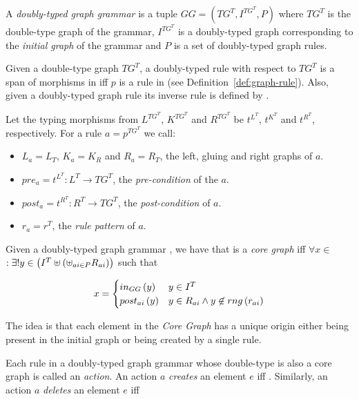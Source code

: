 \begin{definition} A \emph{doubly-typed graph grammar} is a tuple $GG = \left(TG^T, I^{TG^T},P \right)$ where $TG^T$ is the double-type graph of the grammar, $I^{TG^T}$ is a doubly-typed graph corresponding to the \emph{initial graph} of the grammar and $P$ is a set of doubly-typed graph rules. 
\end{definition}

\begin{definition} Given a double-type graph $TG^T$, a doubly-typed rule with respect to $TG^T$ is a span of morphisms \doublyTypedRule{} in \doublyTypedGraphCategory{} iff $p$ is a rule in \typedGraphCategory{} (see Definition~\ref{def:graph-rule}). Also, given a doubly-typed graph rule \doublyTypedRule{} its inverse rule is defined by \inverseDoublyTypedRule{}.

  Let the typing morphisms from $L^{TG^T}$, $K^{TG^T}$ and $R^{TG^T}$ be $t^{L^T}$, $t^{K^T}$ and $t^{R^T}$, respectively. For a rule $a = p^{TG^T}$ we call:

  \begin{itemize}
    \item $L_a = L_T$, $K_a = K_R$ and $R_a = R_T$, the left, gluing and right graphs of $a$.
    \item $pre_a = t^{L^T} : L^T \rightarrow TG^T$, the \emph{pre-condition} of the $a$.
    \item $post_a = t^{R^T} : R^T \rightarrow TG^T$, the \emph{post-condition} of $a$.
    \item $r_a = r^T$, the \emph{rule pattern} of $a$.
  \end{itemize}
\end{definition}

\begin{definition} Given a doubly-typed graph grammar \doublyTypedGraphGrammarCore{}, we have that \coreGraph{} is a \emph{core graph} iff $\forall x \in$ \coreGraph $: \exists! y \in \left(I^T \uplus \left(\uplus_{ai \in P} R_{ai}\right)\right)$ such that

  \[ x =
    \begin{cases}
      in_{GG}\left(y\right) & y \in I^T\\
      post_{ai}\left(y\right) & y \in R_{ai} \land y \not\in rng\left(r_{ai}\right)\\
    \end{cases}
   \]

  \begin{intuition} The idea is that each element in the \emph{Core Graph} has a unique origin either being present in the initial graph or being created by a single rule.
\end{intuition}

  Each rule in a doubly-typed graph grammar whose double-type is also a core graph is called an \emph{action}. An action $a$ \emph{creates} an element $e$ iff . Similarly, an action $a$ \emph{deletes} an element $e$ iff

\end{definition}

